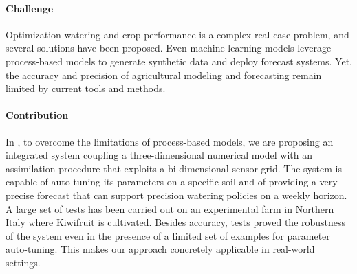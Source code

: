 \paragraph{Challenge}
Optimization watering and crop performance is a complex real-case problem, and several solutions have been proposed.
Even machine learning models leverage process-based models to generate synthetic data and deploy forecast systems.
Yet, the accuracy and precision of agricultural modeling and forecasting remain limited by current tools and methods.

\paragraph{Contribution} In , to overcome the limitations of process-based models, we are proposing an integrated system coupling a three-dimensional numerical model with an assimilation procedure that exploits a bi-dimensional sensor grid.
The system is capable of auto-tuning its parameters on a specific soil and of providing a very precise forecast that can support precision watering policies on a weekly horizon.
A large set of tests has been carried out on an experimental farm in Northern Italy where Kiwifruit is cultivated.
Besides accuracy, tests proved the robustness of the system even in the presence of a limited set of examples for parameter auto-tuning.
This makes our approach concretely applicable in real-world settings.






